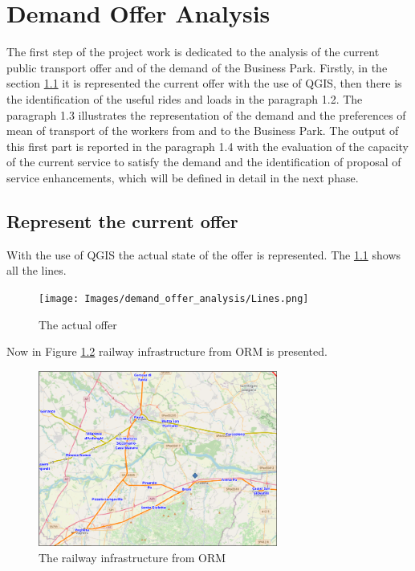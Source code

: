 \chapter{Demand Offer Analysis}
The first step of the project work is dedicated to the analysis of the current public transport offer and of the demand of the Business Park. Firstly, in the section \ref{sec:offer} it is represented the current offer with the use of QGIS, then there is the identification of the useful rides and loads in the paragraph 1.2. The paragraph 1.3 illustrates the representation of the demand and the preferences of mean of transport of the workers from and to the Business Park. The output of this first part is reported in the paragraph 1.4 with the evaluation of the capacity of the current service to satisfy the demand and the identification of proposal of service enhancements, which will be defined in detail in the next phase.

\section{Represent the current offer}
\label{sec:offer}
With the use of QGIS the actual state of the offer is represented. The \ref{fig:offer} shows all the lines.

\begin{figure}[ht]
    \centering
    \texttt{[image: Images/demand\_offer\_analysis/Lines.png]}
    \caption{The actual offer}
    \label{fig:offer}
\end{figure}

Now in Figure \ref{fig:rail} railway infrastructure from ORM is presented.

\begin{figure}[h]
    \centering
    \includegraphics[width=0.7\textwidth]{Images/demand_offer_analysis/railway.png}
    \caption{The railway infrastructure from ORM}
    \label{fig:rail}
\end{figure}

